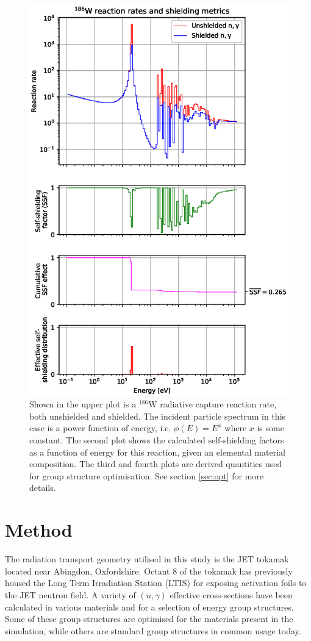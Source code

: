 \begin{figure}[h]
\label{fig:w_cross_section}
\centering
\includegraphics[width=\linewidth]{W186_gamma.eps}
\caption{Shown in the upper plot is a $^{186}$W radiative capture reaction rate, both unshielded and shielded. The incident particle spectrum in this case is a power function of energy, i.e. $\phi(E) = E^{x}$ where $x$ is some constant. The second plot shows the calculated self-shielding factors as a function of energy for this reaction, given an elemental material composition. The third and fourth plots are derived quantities used for group structure optimisation. See section \ref{sec:opt} for more details.}
\end{figure}

\section{Method}
\label{S:2}
The radiation transport geometry utilised in this study is the JET tokamak located near Abingdon, Oxfordshire. Octant 8 of the tokamak has previously housed the Long Term Irradiation Station (LTIS) for exposing activation foils to the JET neutron field. A variety of $(n,\gamma)$ effective cross-sections have been calculated in various materials and for a selection of energy group structures. Some of these group structures are optimised for the materials present in the simulation, while others are standard group structures in common usage today. 

